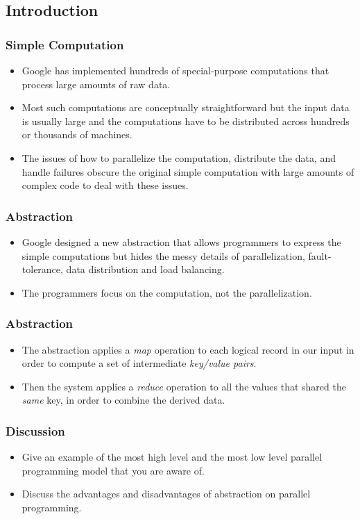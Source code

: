 \documentclass{beamer}
\begin{document}
\subsection{Introduction}

\begin{frame}
  \frametitle{Simple Computation}
  \begin{itemize}
  \item Google has implemented hundreds of special-purpose
    computations that process large amounts of raw data.
  \item Most such computations are conceptually straightforward but
    the input data is usually large and the computations have to be
    distributed across hundreds or thousands of machines.
  \item The issues of how to parallelize the computation, distribute
    the data, and handle failures obscure the original simple
    computation with large amounts of complex code to deal with these
    issues.
  \end{itemize}
\end{frame}

\begin{frame}
  \frametitle{Abstraction}
  \begin{itemize}
    \item Google designed a new abstraction that allows programmers to
      express the simple computations but hides the messy details of
      parallelization, fault-tolerance, data distribution and load
      balancing.  
    \item The programmers focus on the computation, not the
      parallelization.
  \end{itemize}
\end{frame}

\begin{frame}
  \frametitle{Abstraction}
  \begin{itemize}
    \item The abstraction applies a {\em map} operation to each
      logical record in our input in order to compute a set of
      intermediate {\em key/value pairs}.
    \item Then the system applies a {\em reduce} operation to all the
      values that shared the {\em same} key, in order to combine the
      derived data.
  \end{itemize}
\end{frame}

\begin{frame}
  \frametitle{Discussion}
  \begin{itemize}
    \item Give an example of the most high level and the most low
      level parallel programming model that you are aware of.
    \item Discuss the advantages and disadvantages of abstraction on
      parallel programming.
  \end{itemize}
\end{frame}
\end{document}
